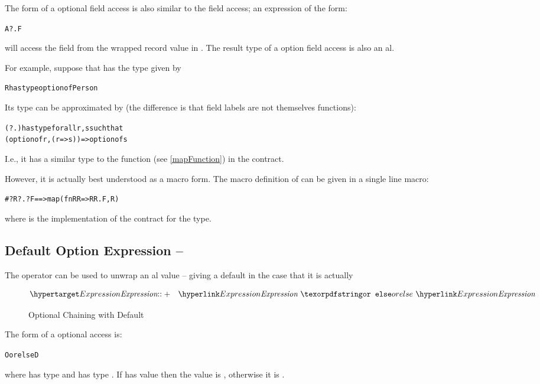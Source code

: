 The form of a optional field access is also similar to the field access; an expression of the form:
\begin{alltt}
A?.F
\end{alltt}
will access the  field from the wrapped record value in . The result type of a option field access is also an al.

For example, suppose that  has the type given by
\begin{alltt}
R has type option of Person
\end{alltt}

Its type can be approximated by (the difference is that field labels are not themselves functions):
\begin{alltt}
(?.) has type for all r,s such that 
  (option of r,(r=>s))=>option of s
\end{alltt}
I.e., it has a similar type to the  function (see \vref{mapFunction}) in the  contract.

However, it is actually best understood as a macro form. The macro definition of  can be given in a single line macro:
\begin{alltt}
#?R ?. ?F ==> map(fn RR=>RR.F,R)
\end{alltt}
where  is the implementation of the  contract for the  type.

\subsection{Default Option Expression -- }
\label{optionDefltChain}

The  operator can be used to unwrap an al value -- giving a default in the case that it is actually  

\begin{figure}[htbp]
\begin{eqnarray*}
\ntDef{Expression}&\arrowplus&\ntRef{Expression}\ \q{or else}\ \ntRef{Expression}
\end{eqnarray*}
\caption{Optional Chaining with Default}\label{optionIndexAccessFig}
\end{figure}

The form of a optional access is:
\begin{alltt}
O or else D
\end{alltt}
where  has type  and  has type . If  has value  then the value is , otherwise it is .

